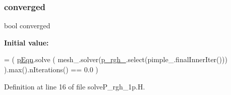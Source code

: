 \subsubsection{\texorpdfstring{converged}{converged}}
{\footnotesize\ttfamily bool converged}

{\bfseries Initial value\+:}
\begin{DoxyCode}
=
( 
    \hyperlink{solveP__rgh__1p_8H_a970568c42754411de522c92f4ec4bc77}{pEqn}.solve
    (
        mesh\_.solver(\hyperlink{updatePP__rghRho__1p_8H_a320090d1a3c1675778a59e981765c77c}{p\_rgh\_}.select(pimple\_.finalInnerIter()))
    ).max().nIterations()
==  0.0 
)
\end{DoxyCode}


Definition at line 16 of file solve\+P\+\_\+rgh\+\_\+1p.\+H.

